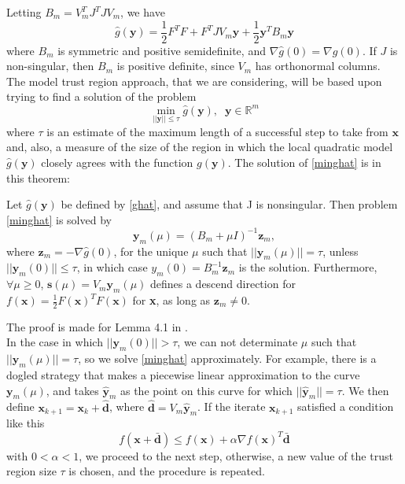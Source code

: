  Letting $B_m = V_m^TJ^TJV_m$, we have 
 \begin{equation}
 \label{ghat}
 \hat{g}(\textbf{y}) = \frac{1}{2} F^TF+F^TJV_m\textbf{y}+\frac{1}{2} \textbf{y}^TB_m\textbf{y}
 \end{equation}
 where $B_m$ is symmetric and positive semidefinite, and $\nabla \hat{g}(0) = \nabla g(0)$. If $J$ is non-singular, then $B_m$ is positive definite, since $V_m$ has orthonormal columns. The model trust region approach, that we are considering, will be based upon trying to find a solution of the problem
 \begin{equation}
 \label{minghat}
 \min_{||\textbf{y}||\le \tau}{\hat{g}(\textbf{y}), \; \; \textbf{y} \in \mathbb{R}^m}
 \end{equation}
 where $\tau$ is an estimate of the maximum length of a successful step to take from $\textbf{x}$ and, also, a measure of the size of the region in which the local quadratic model $\hat{g}(\textbf{y})$ closely agrees with the function $g(\textbf{y})$. The solution of \eqref{minghat} is in this theorem:
 \begin{theorem}
 Let $\hat{g}(\textbf{y})$ be defined by \eqref{ghat}, and assume that J is nonsingular. Then problem \eqref{minghat} is solved by
 \begin{equation*}
 \textbf{y}_m(\mu)= (B_m + \mu I)^{-1}\textbf{z}_m,
 \end{equation*}
 where $\textbf{z}_m= -\nabla\hat{g}(0)$, for the unique $\mu$ such that $||\textbf{y}_m(\mu)||=\tau$, unless $||\textbf{y}_m(0)||\le \tau$, in which case $y_m(0)= B_m^{-1}\textbf{z}_m$ is the solution.
 Furthermore, $\forall \mu \ge 0$, $\textbf{s}(\mu)= V_m\textbf{y}_m(\mu)$ defines a descend direction for $f(\textbf{x})= \frac{1}{2}F(\textbf{x})^TF(\textbf{x})$ for \textbf{x}, as long as $\textbf{z}_m \neq 0$.
 \end{theorem}
 The proof is made for Lemma 4.1 in \cite{Saad}.\\
 In the case in which $||\textbf{y}_m(0)||>\tau$, we can not determinate $\mu$ such that $||\textbf{y}_m(\mu)||=\tau$, so we solve \eqref{minghat} approximately. 
 For example, there is a dogled strategy \cite{Powell} that makes a piecewise linear approximation to the curve $\textbf{y}_m(\mu)$, and takes $\hat{\textbf{y}}_m$ as the point on this curve for which $||\hat{\textbf{y}}_m||=\tau$. We then define $\textbf{x}_{k+1}= \textbf{x}_k + \hat{\textbf{d}}$, where $\hat{\textbf{d}} = V_m \hat{\textbf{y}}_m$. If the iterate $\textbf{x}_{k+1}$ satisfied a condition like this 
 \begin{equation*}
 f(\textbf{x}+\bar{\textbf{d}})\le f(\textbf{x}) + \alpha \nabla f(\textbf{x})^T \bar{\textbf{d}}
 \end{equation*}
 with $0<\alpha<1$, we proceed to the next step, otherwise, a new value of the trust region size $\tau$ is chosen, and the procedure is repeated.\\


